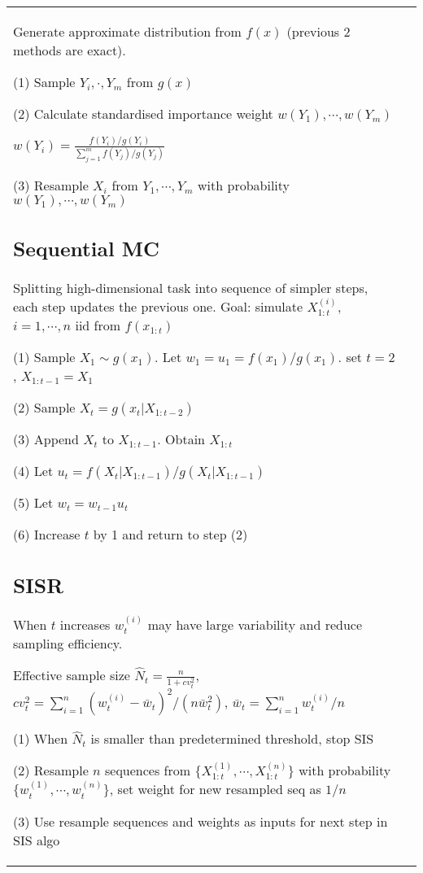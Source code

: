 \begin{tabulary}{\textwidth}{l L}
Generate approximate distribution from $f(x)$ (previous 2 methods are exact).

(1) Sample $Y_i, \cdot, Y_m$ from $g(x)$

(2) Calculate standardised importance weight $w(Y_1), \cdots, w(Y_m)$

$w(Y_i) = \frac{f(Y_i) / g(Y_i)}{\sum_{j=1}^m f(Y_j)/g(Y_j)}$

(3) Resample $X_i$ from $Y_1, \cdots, Y_m$ with probability $w(Y_1), \cdots, w(Y_m)$

\subsection{Sequential MC}

Splitting high-dimensional task into sequence of simpler steps, each step updates the previous one.
Goal: simulate $X_{1:t}^{(i)}$, $i=1, \cdots, n$ iid from $f(x_{1:t})$

(1) Sample $X_1\sim g(x_1)$. Let $w_1 = u_1 = f(x_1)/g(x_1)$. set $t=2$, $X_{1:t-1}=X_1$

(2) Sample $X_t=g(x_t|X_{1:t-2})$

(3) Append $X_t$ to $X_{1:t-1}$. Obtain $X_{1:t}$

(4) Let $u_t = f(X_t|X_{1:t-1})/g(X_t|X_{1:t-1})$

(5) Let $w_t = w_{t-1}u_t$

(6) Increase $t$ by 1 and return to step (2)

\subsection{SISR}

When $t$ increases $w_t^{(i)}$ may have large variability and reduce sampling efficiency.

Effective sample size $\hat N_t = \frac{n}{1 + cv_t^2}$, $cv_t^2 = \sum_{i=1}^{n} (w_t^{(i)} - \bar w_t )^2 / (n \bar w_t^2)$,
$\bar w_t = \sum_{i=1}^n w_t^{(i)} / n$

(1) When $\hat N_t$ is smaller than predetermined threshold, stop SIS

(2) Resample $n$ sequences from $\{ X_{1:t}^{(1)}, \cdots, X_{1:t}^{(n)} \}$
with probability $\{w_t^{(1)}, \cdots, w_t^{(n)}\}$, set weight for new resampled seq as $1/n$

(3) Use resample sequences and weights as inputs for next step in SIS algo

\end{tabulary}

